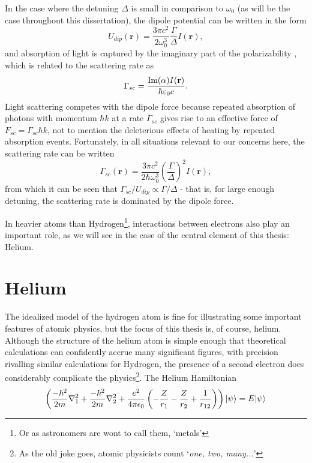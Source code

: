 	In the case where the detuning $\Delta$ is small in comparison to $\omega_0$ (as will be the case throughout this dissertation), the dipole potential can be written in the form \cite{grimm00}
	\begin{equation}
		U_{dip}(\textbf{r}) = \frac{3\pi c^2}{2\omega_0^3}\frac{\Gamma}{\Delta}I(\textbf{r}),
	\end{equation}
	and absorption of light is captured by the imaginary part of the polarizability \cite{FootAtomic}, which is related to the scattering rate as
	\begin{equation}
		\Gamma_{sc} = \frac{\textrm{Im}(\alpha)I(\textbf{r})}{\hbar\varepsilon_0 c}.
	\end{equation}
	Light scattering competes with the dipole force because repeated absorption of photons with momentum $\hbar k$ at a rate $\Gamma_{sc}$ gives rise to an effective force of $F_{sc}=\Gamma_{sc}\hbar k$, not to mention the deleterious effects of heating by repeated absorption events. Fortunately, in all situations relevant to our concerns here, the scattering rate can be written 
	\begin{equation}
		\Gamma_{sc}(\textbf{r}) = \frac{3\pi c^2}{2\hbar\omega_0^3}\left(\frac{\Gamma}{\Delta}\right)^2 I(\textbf{r}),
	\end{equation}
	from which it can be seen that $\Gamma_{sc}/U_{dip} \propto \Gamma/\Delta$ - that is, for large enough detuning, the scattering rate is dominated by the dipole force. 

	In heavier atoms than Hydrogen\footnote{Or as astronomers are wont to call them, `metals'}, interactions between electrons also play an important role, as we will see in the case of the central element of this thesis: Helium.
		
\section{Helium} 

	The idealized model of the hydrogen atom is fine for illustrating some important features of atomic physics, but the focus of this thesis is, of course, helium. Although the structure of the helium atom is simple enough that theoretical calculations can confidently accrue many significant figures, with precision rivalling similar calculations for Hydrogen, the presence of a second electron does considerably complicate the physics\footnote{As the old joke goes, atomic physicists count `\emph{one, two, many...}'}. The Helium Hamiltonian 
	$$
	\left(\frac{-\hbar^2}{2m}\nabla_{1}^2+\frac{-\hbar^2}{2m}\nabla_{2}^2 + \frac{e^2}{4\pi\epsilon_0}\left(-\frac{Z}{r_1}-\frac{Z}{r_2}+\frac{1}{r_{12}}\right) \right)|\psi\rangle = E |\psi\rangle
	$$

